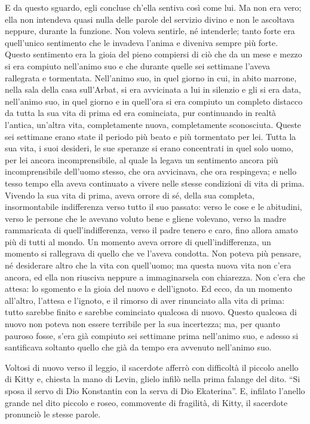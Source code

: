 E da questo sguardo, egli concluse ch'ella sentiva così come lui. Ma non era vero; ella non intendeva quasi nulla delle parole del servizio divino e non le ascoltava neppure, durante la funzione. Non voleva sentirle, né intenderle; tanto forte era quell'unico sentimento che le invadeva l'anima e diveniva sempre più forte. Questo sentimento era la gioia del pieno compiersi di ciò che da un mese e mezzo si era compiuto nell'animo suo e che durante quelle sei settimane l'aveva rallegrata e tormentata. Nell'animo suo, in quel giorno in cui, in abito marrone, nella sala della casa sull'Arbat, si era avvicinata a lui in silenzio e gli si era data, nell'animo suo, in quel giorno e in quell'ora si era compiuto un completo distacco da tutta la sua vita di prima ed era cominciata, pur continuando in realtà l'antica, un'altra vita, completamente nuova, completamente sconosciuta. Queste sei settimane erano state il periodo più beato e più tormentato per lei. Tutta la sua vita, i suoi desideri, le sue speranze si erano concentrati in quel solo uomo, per lei ancora incomprensibile, al quale la legava un sentimento ancora più incomprensibile dell'uomo stesso, che ora avvicinava, che ora respingeva; e nello tesso tempo ella aveva continuato a vivere nelle stesse condizioni di vita di prima. Vivendo la sua vita di prima, aveva orrore di sé, della sua completa, insormontabile indifferenza verso tutto il suo passato: verso le cose e le abitudini, verso le persone che le avevano voluto bene e gliene volevano, verso la madre rammaricata di quell'indifferenza, verso il padre tenero e caro, fino allora amato più di tutti al mondo. Un momento aveva orrore di quell'indifferenza, un momento si rallegrava di quello che ve l'aveva condotta. Non poteva più pensare, né desiderare altro che la vita con quell'uomo; ma questa nuova vita non c'era ancora, ed ella non riusciva neppure a immaginarsela con chiarezza. Non c'era che attesa: lo sgomento e la gioia del nuovo e dell'ignoto. Ed ecco, da un momento all'altro, l'attesa e l'ignoto, e il rimorso di aver rinunciato alla vita di prima: tutto sarebbe finito e sarebbe cominciato qualcosa di nuovo. Questo qualcosa di nuovo non poteva non essere terribile per la sua incertezza; ma, per quanto pauroso fosse, s'era già compiuto sei settimane prima nell'animo suo, e adesso si santificava soltanto quello che già da tempo era avvenuto nell'animo suo. 

Voltosi di nuovo verso il leggio, il sacerdote afferrò con difficoltà il piccolo anello di Kitty e, chiesta la mano di Levin, glielo infilò nella prima falange del dito. ``Si sposa il servo di Dio Konstantin con la serva di Dio Ekaterina''. E, infilato l'anello grande nel dito piccolo e roseo, commovente di fragilità, di Kitty, il sacerdote pronunciò le stesse parole. 

